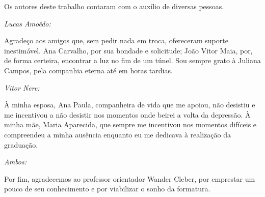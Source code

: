 \begin{agradecimentos}

Os autores deste trabalho contaram com o auxílio de diversas pessoas.

\textit{Lucas Amoêdo:}

Agradeço aos amigos que, sem pedir nada em troca, ofereceram suporte inestimável. Ana Carvalho, por sua bondade e solicitude; João Vitor Maia, por, de forma certeira,
encontrar a luz no fim de um túnel. Sou sempre grato à Juliana Campos, pela companhia
eterna até em horas tardias.

\textit{Vitor Nere:}

À minha esposa, Ana Paula, companheira de vida que me apoiou, não desistiu e
me incentivou a não desistir nos momentos onde beirei a volta da depressão. À minha
mãe, Maria Aparecida, que sempre me incentivou nos momentos difíceis e compreendeu
a minha ausência enquanto eu me dedicava à realização da graduação.

\textit{Ambos:}

Por fim, agradecemos ao professor orientador Wander Cleber, por emprestar um
pouco de seu conhecimento e por viabilizar o sonho da formatura.

\end{agradecimentos}
